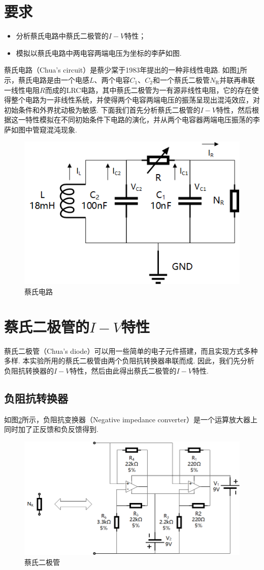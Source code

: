 \documentclass{assignment}
\begin{document}
\section*{要求}
\begin{itemize}
    \item 分析蔡氏电路中蔡氏二极管的$I-V$特性；
    \item 模拟以蔡氏电路中两电容两端电压为坐标的李萨如图.
\end{itemize}

蔡氏电路（Chua's circuit）是蔡少棠于1983年提出的一种非线性电路. 如图\ref{Chua's-circuit}所示，蔡氏电路是由一个电感$L$、两个电容$C_1$、$C_2$和一个蔡氏二极管$N_{\text{R}}$并联再串联一线性电阻$R$而成的LRC电路，其中蔡氏二极管为一有源非线性电阻，它的存在使得整个电路为一非线性系统，并使得两个电容两端电压的振荡呈现出混沌效应，对初始条件和外界扰动极为敏感. 下面我们首先分析蔡氏二极管的$I-V$特性，然后根据这一特性模拟在不同初始条件下电路的演化，并从两个电容器两端电压振荡的李萨如图中管窥混沌现象.

\begin{figure}[h]
    \centering
    \includegraphics[width=.5\columnwidth]{Chua'sCircuit.png}
    \caption{蔡氏电路}
    \label{Chua's-circuit}
\end{figure}

\section{蔡氏二极管的$I-V$特性}
蔡氏二极管（Chua's diode）可以用一些简单的电子元件搭建，而且实现方式多种多样. 本实验所用的蔡氏二极管由两个负阻抗转换器串联而成. 因此，我们先分析负阻抗转换器的$I-V$特性，然后由此得出蔡氏二极管的$I-V$特性.

\subsection{负阻抗转换器}
如图\ref{Chua's-diode}所示，负阻抗变换器（Negative impedance converter）是一个运算放大器上同时加了正反馈和负反馈得到.

\begin{figure}[h]
    \centering
    \includegraphics[width=.5\columnwidth]{Chua'sDiode.png}
    \caption{蔡氏二极管}
    \label{Chua's-diode}
\end{figure}
\end{document}
